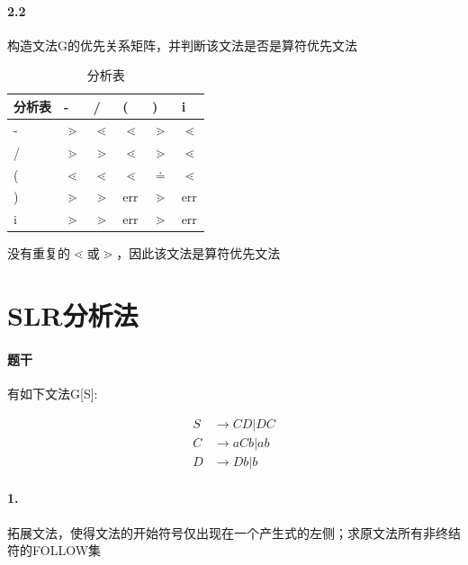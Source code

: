 \documentclass[UTF8]{ctexart} %
\begin{document}
\paragraph{2.2} 构造文法G的优先关系矩阵，并判断该文法是否是算符优先文法

\begin{table}[H]
    \centering
    \begin{tabular}{|p{2cm}<{\centering}|p{1cm}<{\centering}|p{1cm}<{\centering}|p{1cm}<{\centering}|p{1cm}<{\centering}|p{1cm}<{\centering}|}
        \hline
        分析表 & -          & /          & (          & )         & i          \\
        \hline
        -   & $\gtrdot$  & $\lessdot$ & $\lessdot$ & $\gtrdot$ & $\lessdot$ \\
        \hline
        /   & $\gtrdot$  & $\gtrdot$  & $\lessdot$ & $\gtrdot$ & $\lessdot$ \\
        \hline
        (   & $\lessdot$ & $\lessdot$ & $\lessdot$ & $\doteq$  & $\lessdot$ \\
        \hline
        )   & $\gtrdot$  & $\gtrdot$  & err        & $\gtrdot$ & err        \\
        \hline
        i   & $\gtrdot$  & $\gtrdot$  & err        & $\gtrdot$ & err        \\
        \hline
    \end{tabular}
    \caption{分析表}
\end{table}

没有重复的$\lessdot$或$\gtrdot$，因此该文法是算符优先文法

\section{SLR分析法}

\paragraph{题干} 有如下文法G[S]:

\begin{equation}
    \begin{aligned}
        S & \rightarrow CD|DC  \\
        C & \rightarrow aCb|ab \\
        D & \rightarrow Db|b
    \end{aligned}
\end{equation}

\paragraph{1.} 拓展文法，使得文法的开始符号仅出现在一个产生式的左侧；求原文法所有非终结符的FOLLOW集
\end{document}
